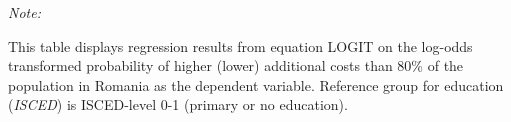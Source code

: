 \begin{table}[htbp!]
\begin{adjustbox}{width = 1\textwidth, max height = 0.95\textheight, center}
\begin{threeparttable}[b]
         \begin{tablenotes}\item \medskip \textit{Note:}
            \item This table displays regression results from equation LOGIT on the log-odds transformed probability of higher (lower) additional costs than 80\% of the population in Romania as the dependent variable. Reference group for education (\textit{ISCED}) is ISCED-level 0-1 (primary or no education).
         \end{tablenotes}
      \end{threeparttable}
   \end{adjustbox}
\end{table}


